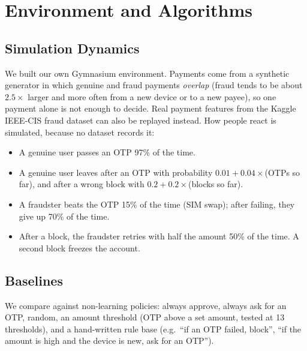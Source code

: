 \documentclass[10pt,twocolumn]{article}
\begin{document}
\section{Environment and Algorithms}
\subsection{Simulation Dynamics}
We built our own Gymnasium environment. Payments come from a synthetic generator in which genuine and fraud
payments \emph{overlap} (fraud tends to be about $2.5\times$ larger and more often from a new device or to a
new payee), so one payment alone is not enough to decide. Real payment features from the Kaggle IEEE-CIS
fraud dataset can also be replayed instead. How people react is simulated, because no dataset records it:
\begin{itemize}
\item A genuine user passes an OTP 97\% of the time.
\item A genuine user leaves after an OTP with probability $0.01+0.04\times$(OTPs so far), and after a wrong
block with $0.2+0.2\times$(blocks so far).
\item A fraudster beats the OTP 15\% of the time (SIM swap); after failing, they give up 70\% of the time.
\item After a block, the fraudster retries with half the amount 50\% of the time. A second block freezes the
account.
\end{itemize}

\subsection{Baselines}
We compare against non-learning policies: always approve, always ask for an OTP, random, an amount threshold
(OTP above a set amount, tested at 13 thresholds), and a hand-written rule base (e.g.\ ``if an OTP failed,
block'', ``if the amount is high and the device is new, ask for an OTP'').
\end{document}
